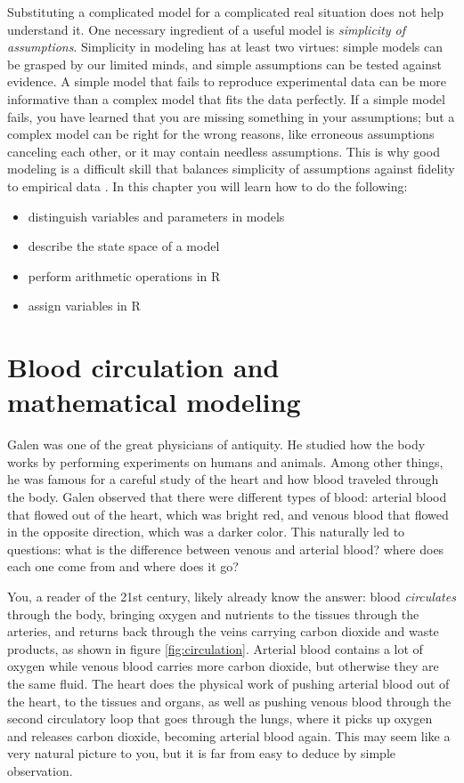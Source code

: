 \documentclass[
]{book}
\begin{document}
Substituting a complicated model for a complicated real situation does not help understand it. One necessary ingredient of a useful model is \emph{simplicity of assumptions}. Simplicity in modeling has at least two virtues: simple models can be grasped by our limited minds, and simple assumptions can be tested against evidence. A simple model that fails to reproduce experimental data can be more informative than a complex model that fits the data perfectly. If a simple model fails, you have learned that you are missing something in your assumptions; but a complex model can be right for the wrong reasons, like erroneous assumptions canceling each other, or it may contain needless assumptions. This is why good modeling is a difficult skill that balances simplicity of assumptions against fidelity to empirical data \citep{cohen_mathematics_2004}. In this chapter you will learn how to do the following:

\begin{itemize}
\item
  distinguish variables and parameters in models
\item
  describe the state space of a model
\item
  perform arithmetic operations in R
\item
  assign variables in R
\end{itemize}

\hypertarget{sec:bio1}{%
\section{Blood circulation and mathematical modeling}\label{sec:bio1}}

Galen  was one of the great physicians of antiquity. He studied how the body works by performing experiments on humans and animals. Among other things, he was famous for a careful study of the heart and how blood traveled through the body. Galen observed that there were different types of blood: arterial blood that flowed out of the heart, which was bright red, and venous blood that flowed in the opposite direction, which was a darker color. This naturally led to questions: what is the difference between venous and arterial blood? where does each one come from and where does it go?

You, a reader of the 21st century, likely already know the answer: blood \emph{circulates} through the body, bringing oxygen and nutrients to the tissues through the arteries, and returns back through the veins carrying carbon dioxide and waste products, as shown in figure \ref{fig:circulation}. Arterial blood contains a lot of oxygen while venous blood carries more carbon dioxide, but otherwise they are the same fluid. The heart does the physical work of pushing arterial blood out of the heart, to the tissues and organs, as well as pushing venous blood through the second circulatory loop that goes through the lungs, where it picks up oxygen and releases carbon dioxide, becoming arterial blood again. This may seem like a very natural picture to you, but it is far from easy to deduce by simple observation.
\end{document}
